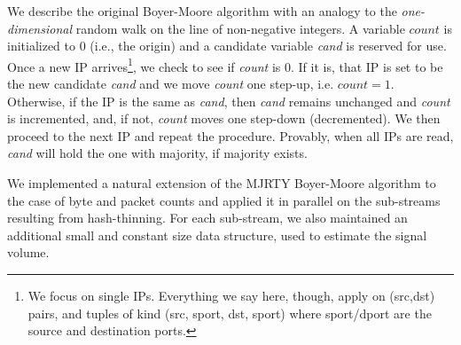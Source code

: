\documentclass[10pt, conference, letterpaper,onecolumn]{IEEEtranv1.8}
\theoremstyle{plain}\newtheorem{thm}{Theorem}\newtheorem{lem}{Lemma}
\theoremstyle{definition}
\begin{document}
 We describe the original  Boyer-Moore algorithm with an analogy to the \emph{one-dimensional}
 random walk on the line of non-negative integers.  A variable $count$ is initialized to $0$ (i.e., the origin)
 and a  candidate variable \emph{cand} is reserved for use. Once a new IP arrives\footnote{We focus on single IPs. Everything we say here, though, apply on (src,dst) pairs,
and tuples of kind (src, sport, dst, sport) where sport/dport are the source and destination ports.},  
 we check to see if \emph{count} is 0. If it is, that IP is set to be the new candidate \emph{cand}
and  we move \emph{count} one step-up, i.e. $count=1$. Otherwise, if the IP is the same as \emph{cand}, then 
\emph{cand} remains unchanged and \emph{count} is incremented, and, if not, \emph{count} moves one step-down 
(decremented). We then proceed to the next IP and repeat the procedure. Provably, when all IPs are read,
\emph{cand} will hold  the one with majority, if majority exists.  

 
We implemented a natural extension of the MJRTY Boyer-Moore algorithm to the case of byte and packet 
counts and applied it in parallel on the sub-streams resulting from hash-thinning. For each sub-stream, we also 
maintained an additional small and constant size data structure, used to estimate the signal volume.
 
\end{document}
